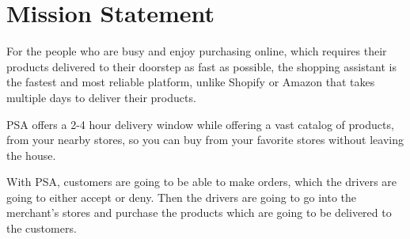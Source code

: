 \section{Mission Statement}
For the people who are busy and enjoy purchasing online, which requires their 
products delivered to their doorstep as fast as possible, the shopping 
assistant is the fastest and most reliable platform, unlike Shopify or Amazon 
that takes multiple days to deliver their products. \newline

\noindent PSA offers a 2-4 hour delivery window while offering a vast 
catalog of products, from your nearby stores, so you can buy from your 
favorite stores without leaving the house. \newline

\noindent With PSA, customers are going to be able to make orders, which the 
drivers are going to either accept or deny. Then the drivers are going to go 
into the merchant's stores and purchase the products which are going to be 
delivered to the customers.
